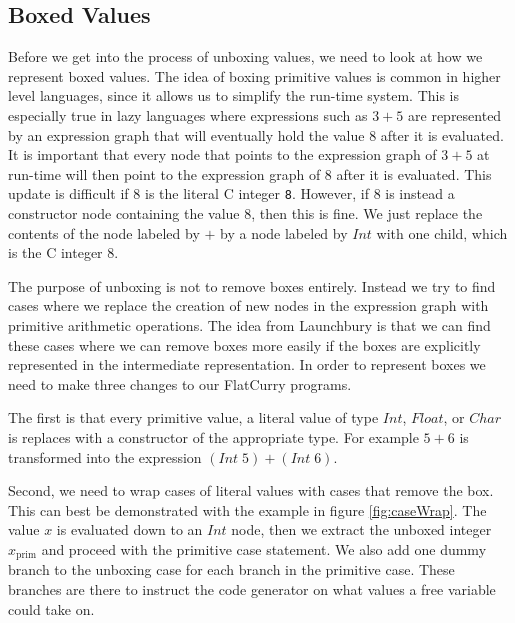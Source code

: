 \documentclass{book}
\theoremstyle{definition}
\newcommand{\Conid}[1]{\mathit{#1}}
\newcommand{\Varid}[1]{\mathit{#1}}
\begin{document}
\subsection{Boxed Values}

Before we get into the process of unboxing values,
we need to look at how we represent boxed values.
The idea of boxing primitive values is common in higher level languages,
since it allows us to simplify the run-time system.
This is especially true in lazy languages where 
expressions such as \ensuremath{\mathrm{3}\mathbin{+}\mathrm{5}} are represented by an expression
graph that will eventually hold the value \ensuremath{\mathrm{8}} after it is evaluated.
It is important that every node that points to the expression graph of \ensuremath{\mathrm{3}\mathbin{+}\mathrm{5}}
at run-time will then point to the expression graph of \ensuremath{\mathrm{8}} after it is evaluated.
This update is difficult if \ensuremath{\mathrm{8}} is the literal C integer \texttt 8.
However, if \ensuremath{\mathrm{8}} is instead a constructor node containing the value 8, then this is fine.
We just replace the contents of the node labeled by \ensuremath{\mathbin{+}} by a node labeled by \ensuremath{\Conid{Int}} with one child,
which is the C integer 8.

The purpose of unboxing is not to remove boxes entirely.
Instead we try to find cases where we replace the creation of new nodes in the expression graph
with primitive arithmetic operations.
The idea from Launchbury \cite{unboxing}
is that we can find these cases where we can remove boxes more easily if the boxes
are explicitly represented in the intermediate representation.
In order to represent boxes we need to make three changes to our FlatCurry programs.

The first is that every primitive value, a literal value of type \ensuremath{\Conid{Int}}, \ensuremath{\Conid{Float}}, or \ensuremath{\Conid{Char}}
is replaces with a constructor of the appropriate type.
For example \ensuremath{\mathrm{5}\mathbin{+}\mathrm{6}} is transformed into the expression \ensuremath{(\Conid{Int}\;\mathrm{5})\mathbin{+}(\Conid{Int}\;\mathrm{6})}.

Second, we need to wrap cases of literal values with cases that remove the box.
This can best be demonstrated with the example in figure \ref{fig:caseWrap}.
The value \ensuremath{\Varid{x}} is evaluated down to an \ensuremath{\Conid{Int}} node, then we extract
the unboxed integer \ensuremath{\Varid{x}_{\text{prim}}} and proceed with the primitive case statement.
We also add one dummy branch to the unboxing case for each branch in the primitive case.
These branches are there to instruct the code generator on what values a free variable could
take on.
\end{document}
